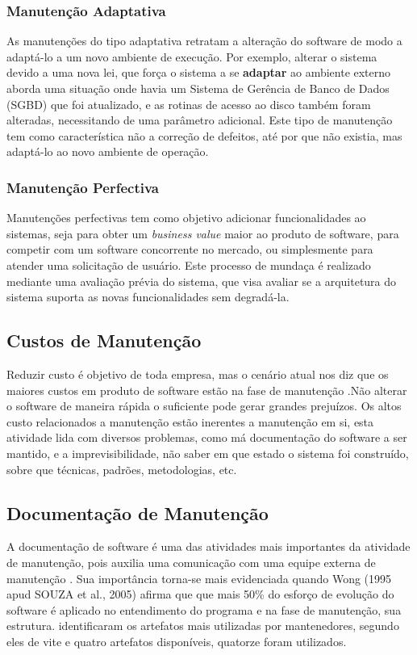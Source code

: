 \subsubsection{Manutenção Adaptativa}
As manutenções do tipo adaptativa retratam a alteração do software de modo a adaptá-lo a um novo ambiente de execução. Por exemplo, alterar o sistema devido a uma nova lei, que força o sistema a se \textbf{adaptar} ao ambiente externo  aborda uma situação onde havia um Sistema de  Gerência de Banco de Dados (SGBD) que foi atualizado, e as rotinas de acesso ao disco também foram alteradas, necessitando de uma parâmetro adicional. Este tipo de manutenção tem como característica não a correção de defeitos, até por que não existia, mas adaptá-lo ao novo ambiente de operação.
\subsubsection{Manutenção Perfectiva}
Manutenções perfectivas tem como objetivo adicionar funcionalidades ao sistemas, seja para obter um \textit{business value} maior ao produto de software, para competir com um software concorrente no mercado, ou simplesmente para atender uma solicitação de usuário. Este processo de mundaça é realizado mediante uma avaliação prévia  do sistema, que visa avaliar se a arquitetura do sistema suporta as novas funcionalidades sem degradá-la.
\subsection{Custos de Manutenção}
Reduzir custo é objetivo de toda empresa, mas o cenário atual nos diz que os maiores custos em produto de software estão na fase de manutenção \cite{pigoski1997}.Não alterar o software de maneira rápida o suficiente pode gerar grandes prejuízos. Os altos custo relacionados a manutenção estão inerentes a manutenção em si, esta atividade lida com diversos problemas, como má documentação do software a ser mantido, e a imprevisibilidade, não saber em que estado o sistema foi construído, sobre que técnicas, padrões, metodologias, etc. 
\subsection{Documentação de Manutenção}
A documentação de software é uma das atividades mais importantes da atividade de manutenção, pois auxilia uma comunicação com uma equipe externa de manutenção \cite{sergio2005}. Sua importância torna-se mais evidenciada quando Wong (1995 apud SOUZA et al., 2005) afirma que que mais 50\% do esforço de evolução do software é aplicado no entendimento do programa e na fase de manutenção, sua estrutura.  identificaram os artefatos mais utilizadas por mantenedores, segundo eles de vite e quatro artefatos disponíveis, quatorze foram utilizados.


